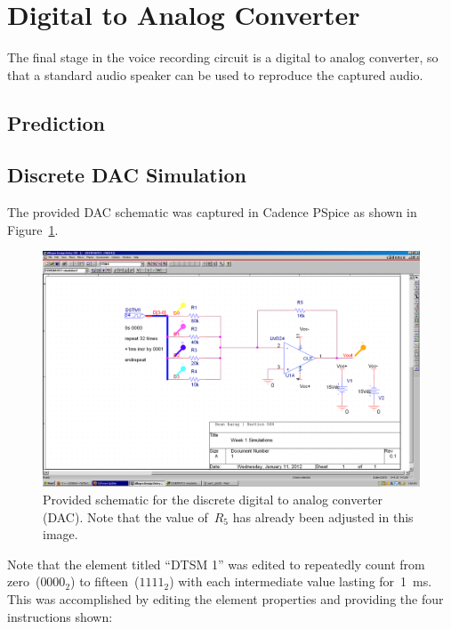 \section{Digital to Analog Converter}
The final stage in the voice recording circuit is a digital to analog
converter, so that a standard audio speaker can be used to reproduce the
captured audio.
\subsection{Prediction}

\subsection{Discrete DAC Simulation}
The provided DAC schematic was captured in Cadence PSpice as shown in
Figure~\ref{f:dac_schem}.
%
\begin{figure}[H]
\centering
	\includegraphics[width=.8\textwidth]{img/shot/part1_schem.PNG}
	\parbox{.8\textwidth}{
	\caption[Discrete DAC --- Schematic]{Provided schematic for the discrete
	digital to analog converter (DAC).  Note that the value of~$R_5$ has
	already been adjusted in this image.}
	\label{f:dac_schem}}
\end{figure}
%
Note that the element titled ``DTSM 1'' was edited to repeatedly count from
zero~($0000_2$) to fifteen~($1111_2$) with each intermediate value
lasting for~\SI{1}{\milli\second}.  This was accomplished by editing the
element properties and providing the four instructions shown:
%
\begin{itemize*}
	\item {}
	\item {}
	\item {}
	\item {}
\end{itemize*}
